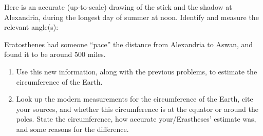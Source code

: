 \documentclass[noauthor,nooutcomes,handout]{ximera}
\begin{document}
\mynewpage




\begin{question}
  Here is an accurate (up-to-scale) drawing of the stick and the
  shadow at Alexandria, during the longest day of summer at noon.
  Identify and measure the relevant angle(s):
    \begin{center}
    \end{center}

 \end{question}
 \mynewpage

\begin{question}
Eratosthenes had someone ``pace'' the distance from Alexandria
    to Aswan, and found it to be around $500$ miles. 
    
\begin{enumerate}
 \item Use this new information, along with the previous problems, to
   estimate the circumference of the Earth.
 \item Look up the modern measurements for the circumference of the
   Earth, cite your sources, and whether this circumference is at the
   equator or around the poles. State the circumference, how accurate
   your/Erastheses' estimate was, and some reasons for the difference.
\end{enumerate}

 \end{question}
\end{document}
